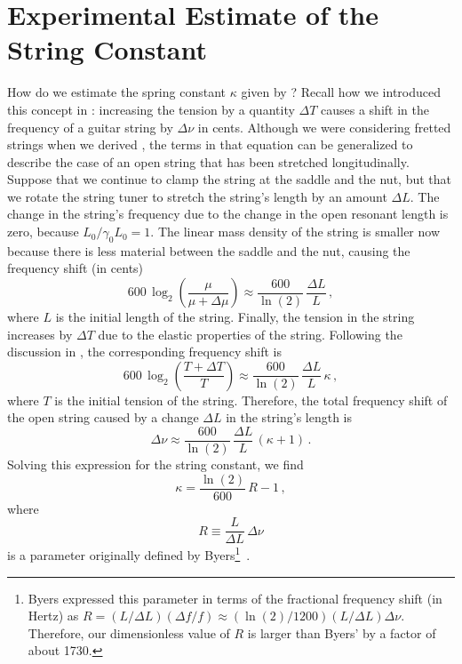%
%
%

 \section{Experimental Estimate of the String Constant\label{sct:exp}}

How do we estimate the spring constant $\kappa$ given by ? Recall how we introduced this concept in : increasing the tension by a quantity $\Delta T$ causes a shift in the frequency of a guitar string by $\Delta \nu$ in cents. Although we were considering fretted strings when we derived , the terms in that equation can be generalized to describe the case of an open string that has been stretched longitudinally. Suppose that we continue to clamp the string at the saddle and the nut, but that we rotate the string tuner to stretch the string's length by an amount $\Delta L$. The change in the string's frequency due to the change in the open resonant length is zero, because $L_0 / \gamma_0 L_0 = 1$. The linear mass density of the string is smaller now because there is less material between the saddle and the nut, causing the frequency shift (in cents)
 \begin{equation}
600\, \log_2 \left(  \frac{\mu}{\mu + \Delta \mu} \right) \approx \frac{600}{\ln(2)}\, \frac{\Delta L}{L}\, ,
 \end{equation}
where $L$ is the initial length of the string. Finally, the tension in the string increases by $\Delta T$ due to the elastic properties of the string. Following the discussion in , the corresponding frequency shift  is
 \begin{equation}
600\, \log_2 \left(  \frac{T + \Delta T}{T} \right) \approx \frac{600}{\ln(2)}\, \frac{\Delta L}{L}\, \kappa\, ,
 \end{equation}
where $T$ is the initial tension of the string. Therefore, the total frequency shift of the open string caused by a change $\Delta L$ in the string's length is
 \begin{equation}
\Delta \nu \approx \frac{600}{\ln(2)}\, \frac{\Delta L}{L}\, (\kappa + 1)\, .
 \end{equation}
Solving this expression for the string constant, we find
 \begin{equation}
\kappa = \frac{\ln(2)}{600}\, R - 1\, ,
 \end{equation}
where
 \begin{equation}
R \equiv \frac{L}{\Delta L}\, \Delta \nu
 \end{equation}
is a parameter originally defined by Byers\footnote{Byers expressed this parameter in terms of the fractional frequency shift (in Hertz) as $R = (L/\Delta L) (\Delta f/f) \approx (\ln(2)/1200) (L/\Delta L) \Delta \nu$. Therefore, our dimensionless value of $R$ is larger than Byers' by a factor of about 1730.}~\cite{ref:byers1996cgi,ref:varieschi2010icf}.

